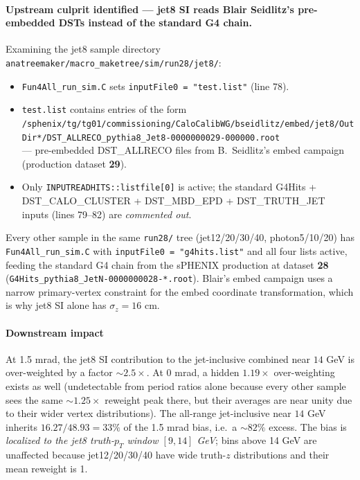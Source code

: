\documentclass[11pt,a4paper]{article}
\newcommand{\pT}{$p_T$}
\begin{document}
\paragraph{Upstream culprit identified --- jet8 SI reads Blair Seidlitz's pre-embedded DSTs instead of the standard G4 chain.} Examining the jet8 sample directory \texttt{anatreemaker/macro\_maketree/sim/run28/jet8/}:
\begin{itemize}
  \item \texttt{Fun4All\_run\_sim.C} sets \texttt{inputFile0 = "test.list"} (line 78).
  \item \texttt{test.list} contains entries of the form\\
        \texttt{/sphenix/tg/tg01/commissioning/CaloCalibWG/bseidlitz/embed/jet8/OutDir*/DST\_ALLRECO\_pythia8\_Jet8-0000000029-000000.root}\\
        --- pre-embedded DST\_ALLRECO files from B.\ Seidlitz's embed campaign (production dataset \textbf{29}).
  \item Only \texttt{INPUTREADHITS::listfile[0]} is active; the standard G4Hits + DST\_CALO\_CLUSTER + DST\_MBD\_EPD + DST\_TRUTH\_JET inputs (lines 79--82) are \emph{commented out}.
\end{itemize}
Every other sample in the same \texttt{run28/} tree (jet12/20/30/40, photon5/10/20) has \texttt{Fun4All\_run\_sim.C} with \texttt{inputFile0 = "g4hits.list"} and all four lists active, feeding the standard G4 chain from the sPHENIX production at dataset \textbf{28} (\texttt{G4Hits\_pythia8\_JetN-0000000028-*.root}). Blair's embed campaign uses a narrow primary-vertex constraint for the embed coordinate transformation, which is why jet8 SI alone has $\sigma_z = 16$ cm.

\paragraph{Downstream impact} At 1.5 mrad, the jet8 SI contribution to the jet-inclusive combined near $14$ GeV is over-weighted by a factor $\sim 2.5\times$. At 0 mrad, a hidden $1.19\times$ over-weighting exists as well (undetectable from period ratios alone because every other sample sees the same $\sim 1.25\times$ reweight peak there, but their averages are near unity due to their wider vertex distributions). The all-range jet-inclusive near $14$ GeV inherits $16.27/48.93 = 33\%$ of the 1.5 mrad bias, i.e.\ a $\sim 82\%$ excess. The bias is \emph{localized to the jet8 truth-\pT{} window $[9, 14]$ GeV}; bins above 14 GeV are unaffected because jet12/20/30/40 have wide truth-$z$ distributions and their mean reweight is 1.
\end{document}
